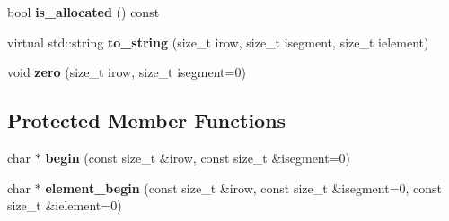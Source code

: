 \begin{DoxyCompactItemize}
\item 
bool {\bfseries is\+\_\+allocated} () const \hypertarget{classField_a9b6c13c9577ce803d03ea56d0b220170}{}\label{classField_a9b6c13c9577ce803d03ea56d0b220170}

\item 
virtual std\+::string {\bfseries to\+\_\+string} (size\+\_\+t irow, size\+\_\+t isegment, size\+\_\+t ielement)\hypertarget{classField_a7027f7704b3dd815171ec0673b015680}{}\label{classField_a7027f7704b3dd815171ec0673b015680}

\item 
void {\bfseries zero} (size\+\_\+t irow, size\+\_\+t isegment=0)\hypertarget{classField_a8f7e5b0d893a09a654c890d5e2723bb3}{}\label{classField_a8f7e5b0d893a09a654c890d5e2723bb3}

\end{DoxyCompactItemize}
\subsection*{Protected Member Functions}
\begin{DoxyCompactItemize}
\item 
char $\ast$ {\bfseries begin} (const size\+\_\+t \&irow, const size\+\_\+t \&isegment=0)\hypertarget{classField_a8402c4cc84e7c2559bb200c0a770a999}{}\label{classField_a8402c4cc84e7c2559bb200c0a770a999}

\item 
char $\ast$ {\bfseries element\+\_\+begin} (const size\+\_\+t \&irow, const size\+\_\+t \&isegment=0, const size\+\_\+t \&ielement=0)\hypertarget{classField_ac744b63e719e32c642d7628e0135f91d}{}\label{classField_ac744b63e719e32c642d7628e0135f91d}

\end{DoxyCompactItemize}
